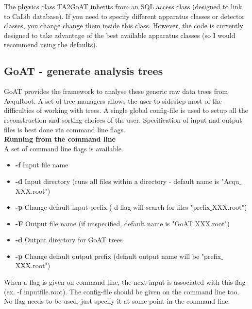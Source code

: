 \documentclass[12pt]{article}
\begin{document}
\noindent The physics class TA2GoAT inherits from an SQL access class (designed to link to CaLib database). If you need to specify different apparatus classes or detector classes, you change change them inside this class. However, the code is currently designed to take advantage of the best available apparatus classes (so I would recommend using the defaults).

\subsection{GoAT - generate analysis trees}
GoAT provides the framework to analyse these generic raw data trees from AcquRoot. A set of tree managers allows the user to sidestep most of the difficulties of working with trees. A single global config-file is used to setup all the reconstruction and sorting choices of the user. Specification of input and output files is best done via command line flags. \\

\noindent \textbf{Running from the command line}\\
A set of command line flags is available
\begin{itemize}
\item \textbf{-f} \hspace{3mm}Input file name
\item \textbf{-d} \hspace{3mm}Input directory (runs all files within a directory - default name is "Acqu$\_$XXX.root")
\item \textbf{-p} \hspace{2mm}Change default input prefix (-d flag will search for files "prefix$\_$XXX.root")
\item \textbf{-F} \hspace{3mm}Output file name (if unspecified, default name is "GoAT$\_$XXX.root")
\item \textbf{-d} \hspace{3mm}Output directory for GoAT trees 
\item \textbf{-p} \hspace{2mm}Change default output prefix (default output name will be "prefix$\_$XXX.root")
\end{itemize}
\vspace{2mm}
\noindent When a flag is given on command line, the next input is associated with this flag (ex. -f inputfile.root). The config-file should be given on the command line too. No flag needs to be used, just specify it at some point in the command line. \\
\vspace{0.5cm}
\end{document}
